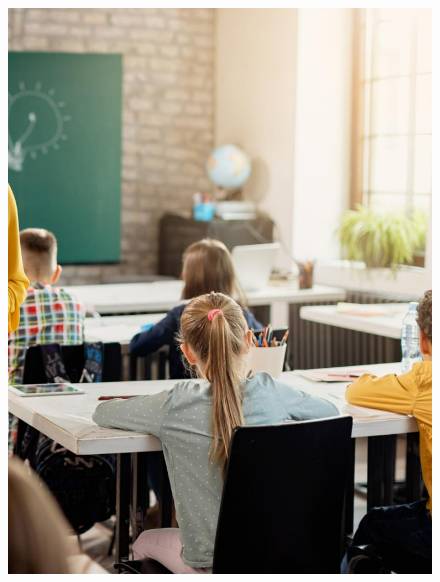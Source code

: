 \begin{figure}[htpb]
\vspace*{-2.5cm}
\hspace{-3cm}\includegraphics[height=\paperheight]{../separadores/separadorCNT5B.png}
\end{figure}

\setcounter{chapter}{0}



 
 
 

%

%

